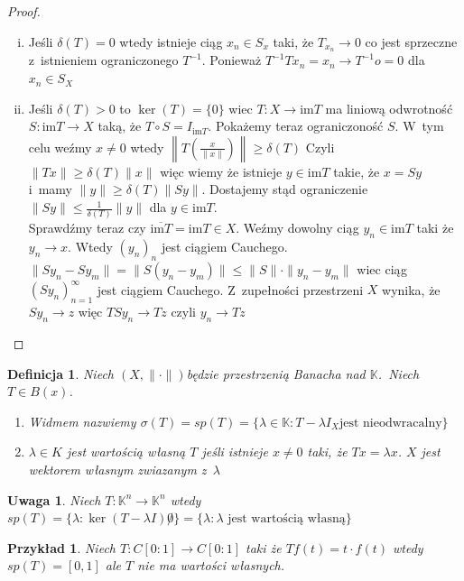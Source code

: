\documentclass[11pt]{mwrep}
\renewcommand{\[}{\begin{equation}}
\renewcommand{\]}{\end{equation}}
\newcommand{\K}{\ensuremath{\mathbb{K}}}
\newcommand{\norm}{\|\cdot\|}
\newcommand{\spac}[1][X]{$(#1,\norm)$}
\newcommand{\im}{\mathrm{im}}
\newtheorem{uwaga}[subsection]{Uwaga}
\newtheorem{de}[subsection]{Definicja}
\newtheorem{ex}[subsection]{Przykład}
\newcounter{numer}
\begin{document}
\begin{proof}
	\begin{enumerate}[(i)]
		\item Jeśli $ \delta(T) =0$ wtedy istnieje ciąg $x_n \in S_x$ taki, że $T_{x_{n}}\to 0$ co jest sprzeczne 
			z~istnieniem ograniczonego $T^{-1}$.  Ponieważ $ T^{-1 }T x_n = x_n \to T^{-1}o = 0$ dla $x_n \in S_X$ 
		\item Jeśli $\delta(T)>0$ to $\ker(T) = \{0\}$ wiec $ T\colon X \to \im T$ ma liniową odwrotność
			$S\colon \im T \to X$ taką, że $T\circ S = I_{\im T}$.
			Pokażemy teraz ograniczoność $S$. W~tym celu weźmy $x\not = 0$ wtedy $\left\|T\left( \frac{x}{\|x\|} \right)\right\|\ge \delta(T)$
			Czyli $\|Tx\| \ge \delta(T) \|x\|$ więc wiemy że istnieje $y\in \im T$ takie, że $x=Sy$ i~mamy 
			$\|y\|\ge \delta(T) \|Sy\|$.
			Dostajemy stąd ograniczenie $\|Sy\| \le \frac{1}{\delta(T)}\|y\|$ dla $y\in \im T$.\\
			Sprawdźmy teraz czy $\overline{\im T} = \im T \in X$.
			Weźmy dowolny ciąg $y_n \in \im T$ taki że $y_n \to x$.  Wtedy $(y_n)_n$ jest ciągiem Cauchego. 
			$\|S{y_n} - S{y_m}\|=\|S(y_n - y_m)\|\le \|S\| \cdot \|y_n -y_m\|$ wiec ciąg $(S y_n)_{n=1}^\infty$ jest ciągiem Cauchego.
			Z~zupełności przestrzeni $X$ wynika, że $S y_n \to z$ więc $T S y_n \to T z$ czyli $y_n \to Tz$ 
	\end{enumerate}
\end{proof}
\begin{de}
	Niech \spac będzie przestrzenią Banacha nad \K.~Niech $T \in B(x)$.
	\begin{enumerate}
		\item Widmem nazwiemy $\sigma(T) = sp(T) = \{ \lambda \in \K : T -\lambda I_X \textrm{jest nieodwracalny}\}$ 
		\item $\lambda\in K$ jest wartością własną $T$ jeśli istnieje $x\not  =0$ taki, że $Tx = \lambda x$. 
			$X$ jest wektorem  własnym zwiazanym z~$\lambda$
	\end{enumerate}
\end{de}
\begin{uwaga}
	Niech $T\colon \K^n \to \K^n$ wtedy $sp(T) = \{\lambda: \ker(T-\lambda I) \not 0\} = \{\lambda :\lambda \textrm{ jest wartością własną} \}$
\end{uwaga}
\begin{ex}
	Niech $T\colon C[0:1] \to C[0:1]$ taki że $Tf(t) = t\cdot f(t)$ wtedy $sp(T) = [0,1]$ ale $T$ nie ma wartości własnych.
\end{ex}
\end{document}
